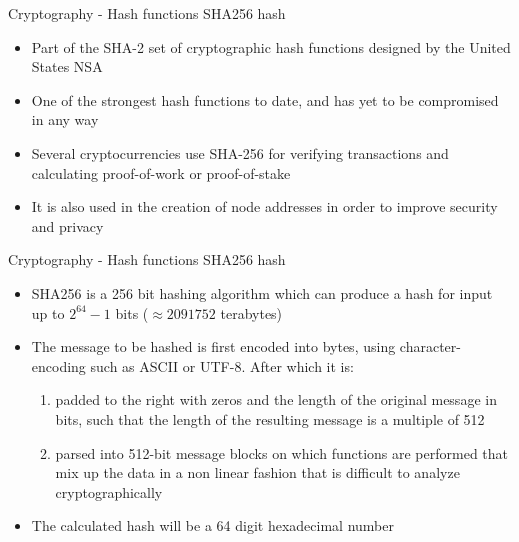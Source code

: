 \documentclass[11pt]{beamer}
\begin{document}

\begin{frame}{Cryptography - Hash functions}
	SHA256 hash
	\begin{itemize}
		\item Part of the SHA-2 set of cryptographic hash functions designed by the United States NSA
		\item One of the strongest hash functions to date, and has yet to be compromised in any way
		\item Several cryptocurrencies use SHA-256 for verifying transactions and calculating proof-of-work or proof-of-stake
		\item It is also used in the creation of node addresses in order to improve security and privacy
	\end{itemize}
\end{frame}


\begin{frame}{Cryptography - Hash functions}
	SHA256 hash
	\begin{itemize}
		\item SHA256 is a 256 bit hashing algorithm which can produce a hash for input up to $ 2^{64}-1$ bits ($\approx  2 091 752$ terabytes)
		\item The message to be hashed is first encoded into bytes, using character-encoding such as ASCII or UTF-8. After which it is:
		\begin{enumerate}
			\item padded to the right with zeros and the length of the original message in bits, such that the length of the resulting message is a multiple of 512
			\item parsed into 512-bit message blocks on which functions are performed that mix up the data in a non linear fashion that is difficult to analyze cryptographically
		\end{enumerate}
		\item The calculated hash will be a 64 digit hexadecimal number
	\end{itemize}
\end{frame}

\end{document}
